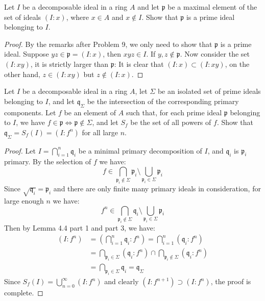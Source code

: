 \documentclass{solution}
\begin{document}
\begin{problem}
    Let $I$ be a decomposable ideal in a ring $A$ and let $\mathfrak{p}$ be a maximal element of the set of ideals $(I : x)$, where $x \in A$ and $x \notin I$. Show that $\mathfrak{p}$ is a prime ideal belonging to $I$.
\end{problem}

\begin{proof}
    By the remarks after Problem 9, we only need to show that $\mathfrak{p}$ is a prime ideal. Suppose $yz \in \mathfrak{p} = (I : x)$, then $xyz \in I$. If $y, z \notin \mathfrak{p}$. Now consider the set $(I : xy)$, it is strictly larger than $\mathfrak{p}$: It is clear that $(I : x) \subset (I : xy)$, on the other hand, $z \in (I : xy)$ but $z \notin (I : x)$.
\end{proof}

\begin{problem}
    Let $I$ be a decomposable ideal in a ring $A$, let $\Sigma$ be an isolated set of prime ideals belonging to $I$, and let $\mathfrak{q}_{\Sigma}$ be the intersection of the corresponding primary components. Let $f$ be an element of $A$ such that, for each prime ideal $\mathfrak{p}$ belonging to $I$, we have $f \in \mathfrak{p} \Leftrightarrow \mathfrak{p} \notin \Sigma$, and let $S_f$ be the set of all powers of $f$. Show that $\mathfrak{q}_{\Sigma} = S_f(I) = (I : f^n)$ for all large $n$.
\end{problem}

\begin{proof}
    Let $I = \bigcap\limits_{i = 1}^{n} \mathfrak{q}_i$ be a minimal primary decomposition of $I$, and $\mathfrak{q}_i$ is $\mathfrak{p}_i$ primary. By the selection of $f$ we have:
    $$f \in \bigcap\limits_{\mathfrak{p}_i \notin \Sigma} \mathfrak{p}_i \setminus \bigcup\limits_{\mathfrak{p}_i \in \Sigma} \mathfrak{p}_i$$
    Since $\sqrt{\mathfrak{q}_i} = \mathfrak{p}_i$ and there are only finite many primary ideals in consideration, for large enough $n$ we have:
    $$f^n \in \bigcap\limits_{\mathfrak{p}_i \notin \Sigma} \mathfrak{q}_i \setminus \bigcup\limits_{\mathfrak{p}_i \in \Sigma} \mathfrak{p}_i$$
    Then by Lemma 4.4 part 1 and part 3, we have:
    $$
        \begin{aligned}
        (I : f^n) &= \left(\bigcap\limits_{i = 1}^{n} \mathfrak{q}_i : f^n\right) = \bigcap\limits_{i = 1}^{n} (\mathfrak{q}_i : f^n) \\
        &= \bigcap\limits_{\mathfrak{p}_i \in \Sigma} (\mathfrak{q}_i : f^n) \cap \bigcap\limits_{\mathfrak{p}_i \notin \Sigma} (\mathfrak{q}_i : f^n) \\
        &= \bigcap\limits_{\mathfrak{p}_i \in \Sigma} \mathfrak{q}_i = \mathfrak{q}_{\Sigma}
        \end{aligned}
    $$
    Since $S_f(I) = \bigcup\limits_{n = 0}^{\infty} (I : f^n)$ and clearly $(I : f^{n + 1}) \supset (I : f^n)$, the proof is complete.
\end{proof}
\end{document}
